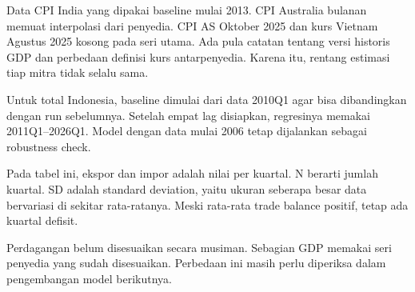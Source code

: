 Data CPI India yang dipakai baseline mulai 2013. CPI Australia bulanan memuat interpolasi dari penyedia. CPI AS Oktober 2025 dan kurs Vietnam Agustus 2025 kosong pada seri utama. Ada pula catatan tentang versi historis GDP dan perbedaan definisi kurs antarpenyedia. Karena itu, rentang estimasi tiap mitra tidak selalu sama.

Untuk total Indonesia, baseline dimulai dari data 2010Q1 agar bisa dibandingkan dengan run sebelumnya. Setelah empat lag disiapkan, regresinya memakai 2011Q1--2026Q1. Model dengan data mulai 2006 tetap dijalankan sebagai robustness check.

\begin{table}[!htbp]\centering\caption{Gambaran sampel total Indonesia, 2011Q1--2026Q1}
\label{tab:desc}
\end{table}

Pada tabel ini, ekspor dan impor adalah nilai per kuartal. N berarti jumlah kuartal. SD adalah standard deviation, yaitu ukuran seberapa besar data bervariasi di sekitar rata-ratanya. Meski rata-rata trade balance positif, tetap ada kuartal defisit.

Perdagangan belum disesuaikan secara musiman. Sebagian GDP memakai seri penyedia yang sudah disesuaikan. Perbedaan ini masih perlu diperiksa dalam pengembangan model berikutnya.
